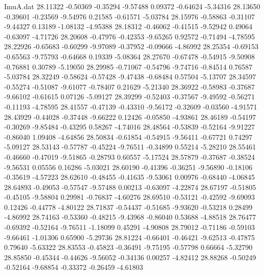 \begin{filecontents}{ImuA.dat}
  28.11322   -0.50369   -0.35294   -9.57488    0.09372   -0.64624   -5.34316
  28.13650   -0.39601   -0.23569   -9.54976    0.21585   -0.61571   -5.03784
  28.15976   -0.58863   -0.31107   -9.44327    0.13189   -1.08132   -4.95388
  28.18312   -0.46062   -0.41515   -9.52942    0.49064   -0.63097   -4.71726
  28.20608   -0.47976   -0.42353   -9.65265    0.92572   -0.71494   -4.78595
  28.22926   -0.65683   -0.60299   -9.97089   -0.37952   -0.09666   -4.86992
  28.25354   -0.69153   -0.65563   -9.75793   -0.64668    0.19339   -5.08364
  28.27670   -0.67478   -0.54915   -9.50908   -0.76881    0.30789   -5.19050
  28.29985   -0.71067   -0.54796   -9.74716   -0.84514    0.76587   -5.03784
  28.32249   -0.58624   -0.57428   -9.47438   -0.68484    0.57504   -5.13707
  28.34597   -0.55274   -0.51087   -9.61077   -0.78407    0.21629   -5.21340
  28.36922   -0.58983   -0.37687   -9.66102   -0.61615    0.07126   -5.09127
  28.39299   -0.52403   -0.37567   -9.49592   -0.56271   -0.11193   -4.78595
  28.41557   -0.47139   -0.43310   -9.56172   -0.32609   -0.03560   -4.91571
  28.43929   -0.44028   -0.37448   -9.66222    0.12426   -0.05850   -4.93861
  28.46189   -0.54197   -0.30269   -9.85484   -0.43295    0.58267   -4.74016
  28.48564   -0.53839   -0.52164   -9.91227   -0.86040    1.09408   -4.64856
  28.50834   -0.61854   -0.54915   -9.56411   -0.67721    0.74297   -5.09127
  28.53143   -0.57787   -0.45224   -9.76511   -0.34899    0.55214   -5.28210
  28.55461   -0.46660   -0.47019   -9.51865   -0.28793    0.60557   -5.17524
  28.57879   -0.37687   -0.38524   -9.56531    0.05556    0.16286   -5.03021
  28.60190   -0.41396   -0.36251   -9.56890   -0.18106   -0.35619   -4.57223
  28.62610   -0.48455   -0.41635   -9.53061    0.00976   -0.68440   -4.06845
  28.64893   -0.49053   -0.57547   -9.57488    0.00213   -0.63097   -4.22874
  28.67197   -0.51805   -0.45105   -9.58804    0.29981   -0.76837   -4.60276
  28.69510   -0.53121   -0.42592   -9.69093    0.12426   -0.44778   -4.80122
  28.71837   -0.54437   -0.51685   -9.93620   -0.53218    0.28499   -4.86992
  28.74163   -0.53360   -0.48215   -9.43968   -0.86040    0.53688   -4.88518
  28.76477   -0.69392   -0.52164   -9.76511   -1.18099    0.45291   -4.90808
  28.79012   -0.71186   -0.59103   -9.66461   -1.01306    0.65900   -5.29736
  28.81224   -0.66401   -0.46421   -9.62513   -0.47875    0.79640   -5.63322
  28.83553   -0.45823   -0.36491   -9.75195   -0.57798    0.66664   -5.32790
  28.85850   -0.45344   -0.44626   -9.56052   -0.34136    0.00257   -4.82412
  28.88268   -0.50249   -0.52164   -9.68854   -0.33372   -0.26459   -4.61803

\end{filecontents}
